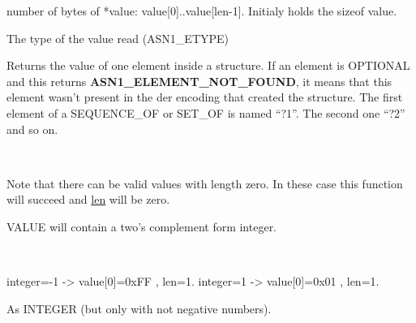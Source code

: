 \documentclass[]{article}
\let\realtextbf=\textbf
\renewcommand{\textbf}[1]{\textcolor{boldcolor}{\realtextbf{#1}}}
\renewcommand{\emph}[1]{\underline{#1}}
\begin{document}
\begin{description}
\itemsep1pt\parskip0pt
\item[int * len]
number of bytes of *value: value{[}0{]}..value{[}len-1{]}. Initialy
holds the sizeof value.
\end{description}

\begin{description}
\itemsep1pt\parskip0pt
\item[unsigned int * etype]
The type of the value read (ASN1\_ETYPE)
\end{description}


Returns the value of one element inside a structure. If an element is
OPTIONAL and this returns \textbf{ASN1\_ELEMENT\_NOT\_FOUND}, it means
that this element wasn't present in the der encoding that created the
structure. The first element of a SEQUENCE\_OF or SET\_OF is named
``?1''. The second one ``?2'' and so on.

~

Note that there can be valid values with length zero. In these case this
function will succeed and \emph{len} will be zero.


VALUE will contain a two's complement form integer.

~

integer=-1 -\textgreater{} value{[}0{]}=0xFF , len=1. integer=1
-\textgreater{} value{[}0{]}=0x01 , len=1.


As INTEGER (but only with not negative numbers).

\end{document}
